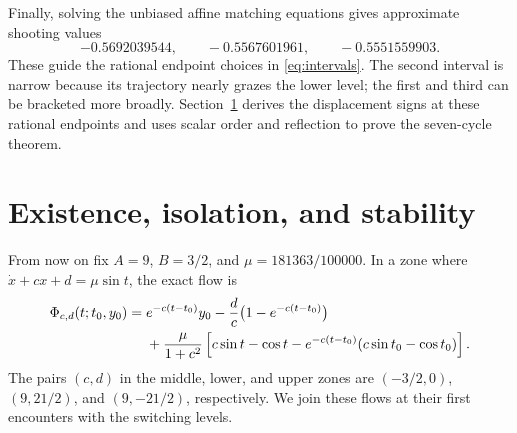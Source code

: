 \documentclass[11pt,a4paper]{article}
\begin{document}
Finally, solving the unbiased affine matching equations gives approximate
shooting values
\[
 -0.5692039544,\qquad -0.5567601961,\qquad -0.5551559903.
\]
These guide the rational endpoint choices in \eqref{eq:intervals}.
The second interval is narrow because its trajectory nearly grazes the
lower level; the first and third can be bracketed more broadly.
Section~\ref{sec:proof} derives the displacement signs at these rational endpoints
and uses scalar order and reflection to prove the seven-cycle theorem.

\section{Existence, isolation, and stability}\label{sec:proof}
From now on fix $A=9$, $B=3/2$, and $\mu=181363/100000$.
In a zone where
$\dot x+cx+d=\mu\sin t$, the exact flow is
\begin{align}\label{eq:flight}
 \Phi_{c,d}(t;t_0,y_0)
 ={}&e^{-c(t-t_0)}y_0-\frac dc\bigl(1-e^{-c(t-t_0)}\bigr)\\
 &+\frac{\mu}{1+c^2}
 \left[c\sin t-\cos t
 -e^{-c(t-t_0)}(c\sin t_0-\cos t_0)\right].\notag
\end{align}
The pairs $(c,d)$ in the middle, lower, and upper zones are
$(-3/2,0)$, $(9,21/2)$, and $(9,-21/2)$, respectively.
We join these flows at their first encounters with the switching levels.
\end{document}
